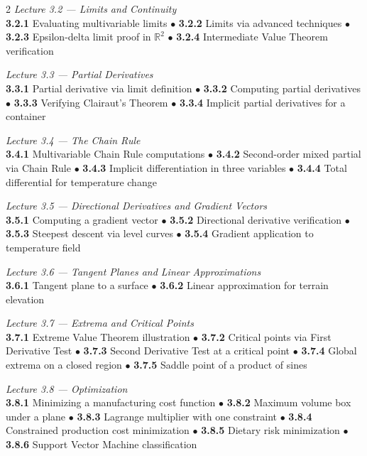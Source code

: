 \begin{multicols}{2}
\medskip
\noindent\textit{Lecture 3.2 --- Limits and Continuity}\\
\textbf{3.2.1} Evaluating multivariable limits \(\bullet\)
\textbf{3.2.2} Limits via advanced techniques \(\bullet\)
\textbf{3.2.3} Epsilon-delta limit proof in $\mathbb{R}^2$ \(\bullet\)
\textbf{3.2.4} Intermediate Value Theorem verification

\medskip
\noindent\textit{Lecture 3.3 --- Partial Derivatives}\\
\textbf{3.3.1} Partial derivative via limit definition \(\bullet\)
\textbf{3.3.2} Computing partial derivatives \(\bullet\)
\textbf{3.3.3} Verifying Clairaut's Theorem \(\bullet\)
\textbf{3.3.4} Implicit partial derivatives for a container

\medskip
\noindent\textit{Lecture 3.4 --- The Chain Rule}\\
\textbf{3.4.1} Multivariable Chain Rule computations \(\bullet\)
\textbf{3.4.2} Second-order mixed partial via Chain Rule \(\bullet\)
\textbf{3.4.3} Implicit differentiation in three variables \(\bullet\)
\textbf{3.4.4} Total differential for temperature change

\medskip
\noindent\textit{Lecture 3.5 --- Directional Derivatives and Gradient Vectors}\\
\textbf{3.5.1} Computing a gradient vector \(\bullet\)
\textbf{3.5.2} Directional derivative verification \(\bullet\)
\textbf{3.5.3} Steepest descent via level curves \(\bullet\)
\textbf{3.5.4} Gradient application to temperature field

\medskip
\noindent\textit{Lecture 3.6 --- Tangent Planes and Linear Approximations}\\
\textbf{3.6.1} Tangent plane to a surface \(\bullet\)
\textbf{3.6.2} Linear approximation for terrain elevation

\medskip
\noindent\textit{Lecture 3.7 --- Extrema and Critical Points}\\
\textbf{3.7.1} Extreme Value Theorem illustration \(\bullet\)
\textbf{3.7.2} Critical points via First Derivative Test \(\bullet\)
\textbf{3.7.3} Second Derivative Test at a critical point \(\bullet\)
\textbf{3.7.4} Global extrema on a closed region \(\bullet\)
\textbf{3.7.5} Saddle point of a product of sines

\medskip
\noindent\textit{Lecture 3.8 --- Optimization}\\
\textbf{3.8.1} Minimizing a manufacturing cost function \(\bullet\)
\textbf{3.8.2} Maximum volume box under a plane \(\bullet\)
\textbf{3.8.3} Lagrange multiplier with one constraint \(\bullet\)
\textbf{3.8.4} Constrained production cost minimization \(\bullet\)
\textbf{3.8.5} Dietary risk minimization \(\bullet\)
\textbf{3.8.6} Support Vector Machine classification


\end{multicols}
